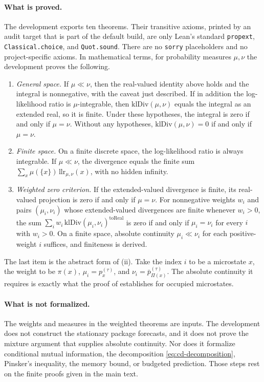 \paragraph{What is proved.} The development exports ten theorems. Their transitive axioms, printed by an audit target that is part of the default build, are only Lean's standard \texttt{propext}, \texttt{Classical.choice}, and \texttt{Quot.sound}. There are no \texttt{sorry} placeholders and no project-specific axioms. In mathematical terms, for probability measures $\mu,\nu$ the development proves the following.
\begin{enumerate}
\item \emph{General space.} If $\mu\ll\nu$, then the real-valued identity above holds and the integral is nonnegative, with the caveat just described. If in addition the log-likelihood ratio is $\mu$-integrable, then $\mathrm{klDiv}(\mu,\nu)$ equals the integral as an extended real, so it is finite. Under these hypotheses, the integral is zero if and only if $\mu=\nu$. Without any hypotheses, $\mathrm{klDiv}(\mu,\nu)=0$ if and only if $\mu=\nu$.
\item \emph{Finite space.} On a finite discrete space, the log-likelihood ratio is always integrable. If $\mu\ll\nu$, the divergence equals the finite sum $\sum_x \mu(\{x\})\,\mathrm{llr}_{\mu,\nu}(x)$, with no hidden infinity.
\item \emph{Weighted zero criterion.} If the extended-valued divergence is finite, its real-valued projection is zero if and only if $\mu=\nu$. For nonnegative weights $w_i$ and pairs $(\mu_i,\nu_i)$ whose extended-valued divergences are finite whenever $w_i>0$, the sum $\sum_i w_i\,\mathrm{klDiv}(\mu_i,\nu_i)^{\mathrm{toReal}}$ is zero if and only if $\mu_i=\nu_i$ for every $i$ with $w_i>0$. On a finite space, absolute continuity $\mu_i\ll\nu_i$ for each positive-weight $i$ suffices, and finiteness is derived.
\end{enumerate}
The last item is the abstract form of (ii). Take the index $i$ to be a microstate $x$, the weight to be $\pi(x)$, $\mu_i=p_x^{(\tau)}$, and $\nu_i=\bar p_{\Pi(x)}^{(\tau)}$. The absolute continuity it requires is exactly what the proof of  establishes for occupied microstates.

\paragraph{What is not formalized.} The weights and measures in the weighted theorems are inputs. The development does not construct the stationary package forecasts, and it does not prove the mixture argument that supplies absolute continuity. Nor does it formalize conditional mutual information, the decomposition \eqref{eq:cd-decomposition}, Pinsker's inequality, the memory bound, or budgeted prediction. Those steps rest on the finite proofs given in the main text.
